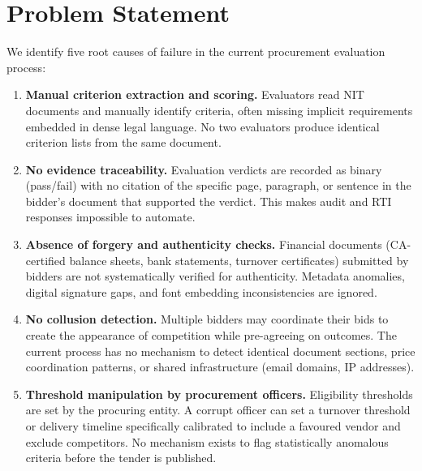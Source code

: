 \documentclass[12pt,a4paper]{article}
\begin{document}
\section{Problem Statement}

We identify five root causes of failure in the current procurement evaluation process:

\begin{enumerate}[leftmargin=*, label=\textbf{P\arabic*.}]

\item \textbf{Manual criterion extraction and scoring.}
Evaluators read NIT documents and manually identify criteria, often missing
implicit requirements embedded in dense legal language. No two evaluators produce
identical criterion lists from the same document.

\item \textbf{No evidence traceability.}
Evaluation verdicts are recorded as binary (pass/fail) with no citation of the
specific page, paragraph, or sentence in the bidder's document that supported the
verdict. This makes audit and RTI responses impossible to automate.

\item \textbf{Absence of forgery and authenticity checks.}
Financial documents (CA-certified balance sheets, bank statements, turnover
certificates) submitted by bidders are not systematically verified for
authenticity. Metadata anomalies, digital signature gaps, and font embedding
inconsistencies are ignored.

\item \textbf{No collusion detection.}
Multiple bidders may coordinate their bids to create the appearance of competition
while pre-agreeing on outcomes. The current process has no mechanism to detect
identical document sections, price coordination patterns, or shared infrastructure
(email domains, IP addresses).

\item \textbf{Threshold manipulation by procurement officers.}
Eligibility thresholds are set by the procuring entity. A corrupt officer can set
a turnover threshold or delivery timeline specifically calibrated to include a
favoured vendor and exclude competitors. No mechanism exists to flag statistically
anomalous criteria before the tender is published.

\end{enumerate}
\end{document}

